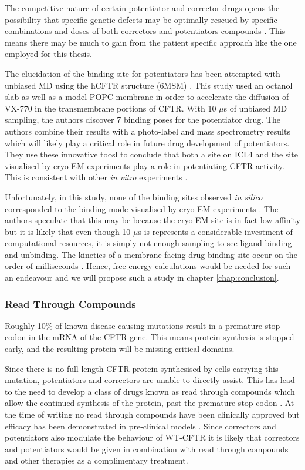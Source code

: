 The competitive nature of certain potentiator and corrector drugs opens the possibility that specific genetic defects may be optimally rescued by specific combinations and doses of both correctors and potentiators compounds \cite{csanady2019}. This means there may be much to gain from the patient specific approach like the one employed for this thesis. 

The elucidation of the binding site for potentiators has been attempted with unbiased MD using the hCFTR structure (6MSM) \cite{laselva2021}. This study used an octanol slab as well as a model POPC membrane in order to accelerate the diffusion of VX-770 in the transmembrane portions of CFTR. With 10 $\mu$s of unbiased MD sampling, the authors discover 7 binding poses for the potentiator drug. The authors combine their results with a photo-label and mass spectrometry results which will likely play a critical role in future drug development of potentiators. They use these innovative toosl to conclude that both a site on ICL4 and the site visualised by cryo-EM experiments play a role in potentiating CFTR activity. This is consistent with other \textit{in vitro} experiments \cite{csanady2019}.

Unfortunately, in this study, none of the binding sites observed \textit{in silico} corresponded to the binding mode visualised by cryo-EM experiments \cite{liu2019}. The authors speculate that this may be because the cryo-EM site is in fact low affinity but it is likely that even though 10 $\mu$s is represents a considerable investment of computational resources, it is simply not enough sampling to see ligand binding and unbinding. The kinetics of a membrane facing drug binding site occur on the order of milliseconds \cite{weikl2016}. Hence, free energy calculations would be needed for such an endeavour and we will propose such a study in chapter \ref{chap:conclusion}. 

\subsubsection{Read Through Compounds}
Roughly 10\% of known disease causing mutations result in a premature stop codon in the mRNA of the CFTR gene. This means protein synthesis is stopped early, and the resulting protein will be missing critical domains. 

Since there is no full length CFTR protein synthesised by cells carrying this mutation, potentiators and correctors are unable to directly assist. This has lead to the need to develop a class of drugs known as read through compounds which allow the continued synthesis of the protein, past the premature stop codon \cite{sharma2021}. At the time of writing no read through compounds have been clinically approved but efficacy has been demonstrated in pre-clinical models \cite{crawford2021}. Since correctors and potentiators also modulate the behaviour of WT-CFTR it is likely that correctors and potentiators would be given in combination with read through compounds and other therapies as a complimentary treatment.

